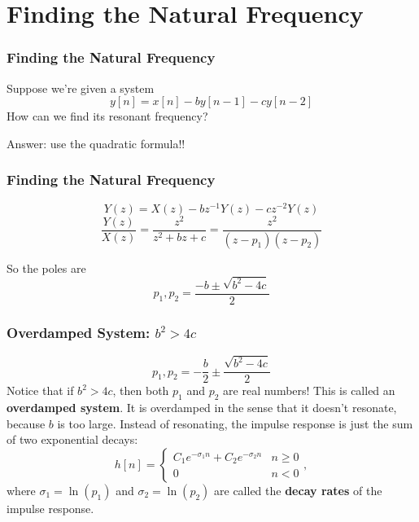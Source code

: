 \documentclass{beamer}
\begin{document}
\section[Solving]{Finding the Natural Frequency}
\setcounter{subsection}{1}

\begin{frame}
  \frametitle{Finding the Natural Frequency}

  Suppose we're given a system
  \begin{displaymath}
    y[n] = x[n] -b y[n-1]-cy[n-2]
  \end{displaymath}
  How can we find its resonant frequency?

  Answer: use the quadratic formula!!
\end{frame}

\begin{frame}
  \frametitle{Finding the Natural Frequency}
  
  \begin{displaymath}
    Y(z) = X(z) -bz^{-1}Y(z)-cz^{-2}Y(z)
  \end{displaymath}
  \begin{displaymath}
    \frac{Y(z)}{X(z)} = \frac{z^2}{z^2+bz+c} = \frac{z^2}{(z-p_1)(z-p_2)}
  \end{displaymath}

  So the poles are
  \begin{displaymath}
    p_1,p_2 = \frac{-b\pm \sqrt{b^2-4c}}{2}
  \end{displaymath}
\end{frame}

\begin{frame}
  \frametitle{Overdamped System: $b^2>4c$}
  
  \begin{displaymath}
    p_1,p_2 = -\frac{b}{2}\pm \frac{\sqrt{b^2-4c}}{2}
  \end{displaymath}
  Notice that if $b^2>4c$, then both $p_1$ and $p_2$ are real numbers!
  This is called an {\bf overdamped system}.  It is overdamped in the
  sense that it doesn't resonate, because $b$ is too large.  Instead
  of resonating, the impulse response is just the sum of two exponential decays:
  \begin{displaymath}
    h[n] = \left\{\begin{array}{ll}
    C_1 e^{-\sigma_1 n}+C_2e^{-\sigma_2 n}  & n \ge 0\\
    0 & n < 0
    \end{array}\right.,
  \end{displaymath}
  where $\sigma_1=\ln(p_1)$ and $\sigma_2=\ln(p_2)$ are called the
  {\bf decay rates} of the impulse response.
\end{frame}
\end{document}
